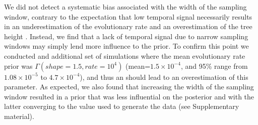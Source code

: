 \documentclass[11pt]{article}
\begin{document}
We did not detect a systematic bias associated with the width of the sampling window, contrary to the expectation that low temporal signal necessarily results in an underestimation of the evolutionary rate and an overestimation of the tree height \citep{duchene2015performance}. Instead, we find that a lack of temporal signal due to narrow sampling windows may simply lend more influence to the prior. To confirm this point we conducted and additional set of simulations where the mean evolutionary rate prior was $\Gamma(shape=1.5, rate=10^{4})$ (mean=$1.5\times 10^{-4}$, and 95\% range from $1.08 \times 10^{-5}$ to $4.7 \times 10^{-4}$), and thus an should lead to an overestimation of this parameter. As expected, we also found that increasing the width of the sampling window resulted in a prior that was less influential on the posterior and with the latter converging to the value used to generate the data (see Supplementary material).
\end{document}

